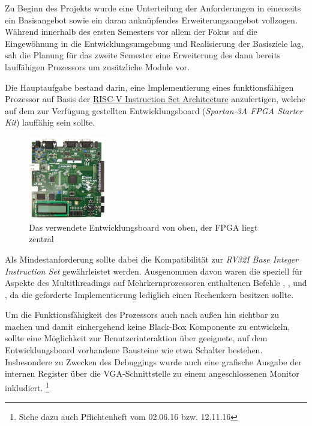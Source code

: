 Zu Beginn des Projekts wurde eine Unterteilung der Anforderungen in einerseits
ein Basisangebot sowie ein daran ankn\"upfendes Erweiterungsangebot vollzogen.
W\"ahrend innerhalb des ersten Semesters vor allem der Fokus auf die
Eingew\"ohnung in die Entwicklungsumgebung und Realisierung der Basisziele lag,
sah die Planung f\"ur das zweite Semester eine Erweiterung des dann bereits
lauff\"ahigen Prozessors um zus\"atzliche Module vor. 

Die Hauptaufgabe bestand darin, eine Implementierung eines funktionsf\"ahigen
Prozessor auf Basis der
\href{https://riscv.org/specifications/}{RISC-V Instruction Set Architecture}
anzufertigen, welche auf dem zur Verf\"ugung gestellten Entwicklungsboard
(\textit{Spartan-3A FPGA Starter Kit}) lauff\"ahig sein sollte.

\begin{figure}[H]
\centering
\includegraphics[width=0.3\textwidth]{Board.png}
\caption{Das verwendete Entwicklungsboard von oben, der FPGA liegt zentral}
\label{fig:board}
\end{figure}

Als Mindestanforderung sollte dabei die Kompatibilit\"at zur
\textit{RV32I Base Integer Instruction Set} gew\"ahrleistet werden. Ausgenommen
davon waren die speziell f\"ur Aspekte des Multithreadings auf
Mehrkernprozessoren enthaltenen Befehle , ,
 und , da die geforderte Implementierung lediglich
einen Rechenkern besitzen sollte.

Um die Funktionsf\"ahigkeit des Prozessors auch nach au\ss{}en hin sichtbar zu
machen und damit einhergehend keine Black-Box Komponente zu entwickeln, sollte
eine M\"oglichkeit zur Benutzerinteraktion \"uber geeignete, auf dem
Entwicklungsboard vorhandene Bausteine wie etwa Schalter bestehen. Insbesondere
zu Zwecken des Debuggings wurde auch eine grafische Ausgabe der internen
Register \"uber die VGA-Schnittstelle zu einem angeschlossenen Monitor
inkludiert.
\footnote{Siehe dazu auch Pflichtenheft vom 02.06.16 bzw. 12.11.16}

